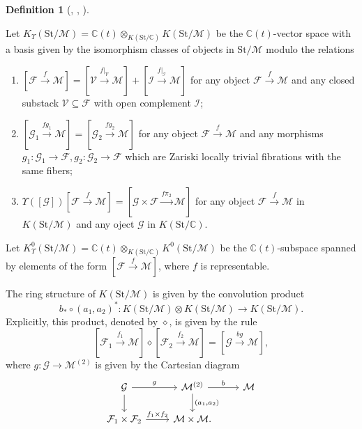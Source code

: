 \documentclass[12pt]{amsart}
\theoremstyle{definition}
\newtheorem{definition}[theorem]{Definition}
\numberwithin{equation}{section}
\begin{document}
\begin{definition}[{\cite[Definition 2.15]{Joyce07}, \cite[Section 5.3]{Bridgeland17}, \cite[Definition 4.3]{FLX24}}]\;
    \label{Scissor relation}    
    
    Let $ K_{\Upsilon}(\mathrm{St}/\mathcal{M}) = \mathbb{C}(t) \otimes_{K(\mathrm{St}/\mathbb{C})} K(\mathrm{St}/\mathcal{M}) $ be the $ \mathbb{C}(t) $-vector space with a basis given by the isomorphism classes of objects in $ \mathrm{St}/\mathcal{M} $ modulo the relations
    \begin{enumerate}
        \item $ [\mathcal{F} \xrightarrow{f} \mathcal{M}] = [\mathcal{V} \xrightarrow{f|_{\mathcal{V}}} \mathcal{M}] + [\mathcal{I} \xrightarrow{f|_{\mathcal{I}}} \mathcal{M}]$ for any object $ \mathcal{F} \xrightarrow{f} \mathcal{M} $ and any closed substack $ \mathcal{V} \subseteq \mathcal{F} $  with open complement $ \mathcal{I} $;
        \item $ [\mathcal{G}_1 \xrightarrow{f g_1}\mathcal{M}] =  [\mathcal{G}_2\xrightarrow{f g_2}\mathcal{M}]  $ for any object $ \mathcal{F} \xrightarrow{f} \mathcal{M} $ and any morphisms $ g_1:\mathcal{G}_1 \to \mathcal{F}, g_2:\mathcal{G}_2 \to \mathcal{F} $ which are Zariski locally trivial fibrations with the same fibers;
        \item $ \Upsilon([\mathcal{G}]) [\mathcal{F} \xrightarrow{f} \mathcal{M}] = [\mathcal{G} \times \mathcal{F} \xrightarrow{f \pi_2} \mathcal{M}]$ for any object $ \mathcal{F} \xrightarrow{f} \mathcal{M} $ in $ K(\mathrm{St}/\mathcal{M}) $ and any oject $ \mathcal{G} $ in $ K(\mathrm{St}/\mathbb{C}) $.
    \end{enumerate}
Let $ K^0_{\Upsilon}(\mathrm{St}/\mathcal{M})= \mathbb{C}(t) \otimes_{K(\mathrm{St}/\mathbb{C})} K^0(\mathrm{St}/\mathcal{M})  $ be the $ \mathbb{C}(t) $-subspace spanned by elements  of the form $ [\mathcal{F} \xrightarrow{f} \mathcal{M}] $, where $ f $ is representable.
\end{definition}

The ring structure of $ K(\mathrm{St}/\mathcal{M}) $ is given by the convolution product
\[ 
b_{*}\circ(a_1,a_2)^*:K(\mathrm{St}/\mathcal{M}) \otimes K(\mathrm{St}/\mathcal{M}) \to K(\mathrm{St}/\mathcal{M}).
\] 
Explicitly, this product, denoted by $ \diamond $, is given by the rule
\[
[\mathcal{F}_1 \xrightarrow{f_1} \mathcal{M}] \diamond [\mathcal{F}_2 \xrightarrow{f_2} \mathcal{M}] = [\mathcal{G} \xrightarrow{bg} \mathcal{M}], 
\]
where $ g:\mathcal{G} \to \mathcal{M}^{(2)} $ is given by the Cartesian diagram
\[
\begin{tikzcd}
\mathcal{G} \arrow[r,"g"]\arrow[d,""] & \mathcal{M}^{(2)} \arrow[r,"b"] \arrow[d,"{(a_1,a_2)}"] & \mathcal{M} \\
\mathcal{F}_1 \times \mathcal{F}_2 \arrow[r,"f_1 \times f_2"]& \mathcal{M} \times \mathcal{M}.
\end{tikzcd}
\]
\end{document}
